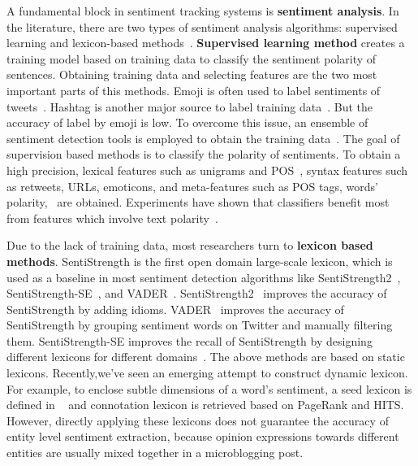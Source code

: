 \documentclass[runningheads]{llncs}
\begin{document}
A fundamental block in sentiment tracking systems is \textbf{sentiment analysis}. In the literature, there are two types of sentiment analysis algorithms: supervised learning and lexicon-based methods~\cite{Ahmed2017SentiCR}. \textbf{Supervised learning method} creates a training model based on training data
to classify the sentiment polarity of sentences. Obtaining training data and selecting features are the two most important parts of this methods. 
Emoji is often used to label sentiments of tweets~\cite{Go2009Supervisedlearning,Pak2010Supervisedlearning}. Hashtag is another major source to label training data~\cite{Papadopoulos2012SocialEvent}.
But the accuracy of label by emoji is low. To overcome this issue, an ensemble of sentiment detection tools is employed to obtain the training data~\cite{Barbosa2010Supervisedlearning}. 
The goal of supervision based methods is to classify the polarity of sentiments. To obtain a high precision, lexical features such as unigrams and POS~\cite{Go2009Supervisedlearning,Davidov2010Supervisedlearning}, syntax features such as retweets, URLs, emoticons, and meta-features such as POS tags, words’ polarity,~\cite{Barbosa2010Supervisedlearning} are obtained.
Experiments have shown that classifiers benefit most from features which involve text polarity~\cite{Agarwal2010Supervisedlearning}.

Due to the lack of training data, most researchers turn to \textbf{lexicon based methods}. 
SentiStrength is the first open domain large-scale lexicon, which is used as a baseline in most sentiment detection algorithms like SentiStrength2~\cite{Thelwall2012lexicon}, SentiStrength-SE~\cite{Rakibul2017SentiStrength-SE}, and VADER~\cite{Hutto2014SSimproved}. 
SentiStrength2~\cite{Thelwall2012lexicon} improves the accuracy of SentiStrength by adding idioms. 
VADER~\cite{Hutto2014SSimproved} improves the accuracy of SentiStrength by grouping sentiment words on Twitter and manually filtering them. 
SentiStrength-SE improves the recall of SentiStrength by designing different lexicons for different domains~\cite{Rakibul2017SentiStrength-SE}. 
The above methods are based on static lexicons.
Recently,we've seen an emerging attempt to construct dynamic lexicon. 
For example, to enclose subtle dimensions of a word’s sentiment, a seed lexicon is defined in ~\cite{Feng2011lexicon} and connotation lexicon is retrieved based on PageRank and HITS. 
However, directly applying these lexicons does not guarantee the accuracy of entity level sentiment extraction, because opinion expressions towards different entities are usually mixed together in a microblogging post. 
\end{document}
